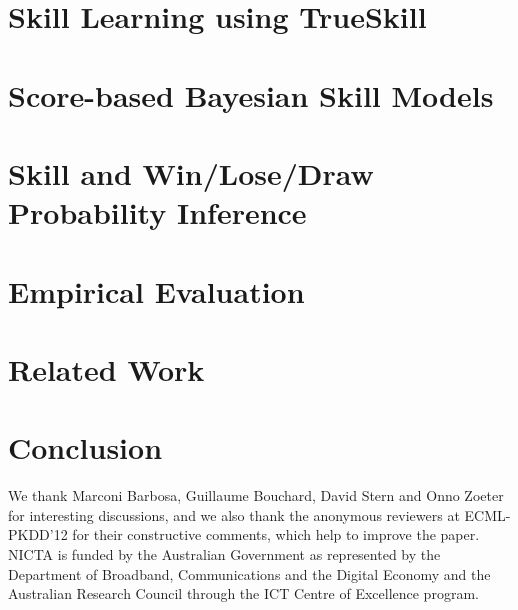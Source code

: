 \section{Skill Learning using TrueSkill}


\section{Score-based Bayesian Skill Models}
\label{sec:PoissonGaussianModels}


\section{Skill and Win/Lose/Draw Probability Inference}


\section{Empirical Evaluation}


\section{Related Work}


\section{Conclusion}


\begin{acknowledgements}
We thank Marconi Barbosa, Guillaume Bouchard, David Stern and Onno Zoeter for interesting discussions, and we also thank the anonymous reviewers at ECML-PKDD'12 for their constructive comments, which help to improve the paper. NICTA is funded by the Australian Government as represented by the Department of Broadband, Communications and the Digital Economy and the Australian Research Council through the ICT Centre of Excellence program.
\end{acknowledgements}






